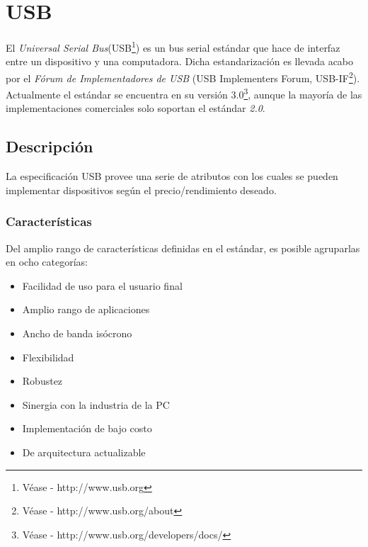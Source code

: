 \chapter{USB}\label{cap:usb}

El \emph{Universal Serial Bus}(USB\footnote{V\'ease - http://www.usb.org}) es
un bus serial est\'andar que hace de interfaz entre un dispositivo y una
computadora.
Dicha estandarizaci\'on es llevada acabo por el \emph{F\'orum de
Implementadores de USB} (USB Implementers Forum, USB-IF\footnote{V\'ease -
http://www.usb.org/about}). 
Actualmente el est\'andar se encuentra en su versi\'on 3.0\footnote{V\'ease -
http://www.usb.org/developers/docs/}, aunque la mayor\'ia de las
implementaciones comerciales solo soportan el est\'andar \emph{2.0}.


\clearpage
\section{Descripci\'on}
La especificaci\'on USB provee una serie de atributos con los cuales se pueden
implementar dispositivos seg\'un el precio/rendimiento deseado.

\subsection{Caracter\'isticas}
Del amplio rango de caracter\'isticas definidas en el est\'andar, es posible
agruparlas en ocho categor\'ias:

\begin{itemize}
 \item Facilidad de uso para el usuario final
 \item Amplio rango de aplicaciones
 \item Ancho de banda is\'ocrono
 \item Flexibilidad
 \item Robustez
 \item Sinergia con la industria de la PC
 \item Implementaci\'on de bajo costo
 \item De arquitectura actualizable
\end{itemize}

